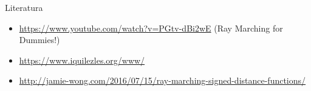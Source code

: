 \documentclass[12pt]{beamer}
\begin{document}
  \begin{frame}{Literatura}
    \begin{itemize}
    \item \href{https://www.youtube.com/watch?v=PGtv-dBi2wE}{https://www.youtube.com/watch?v=PGtv-dBi2wE} (Ray Marching for Dummies!)
    \item \href{https://www.iquilezles.org/www/}{https://www.iquilezles.org/www/}
    \item \href{http://jamie-wong.com/2016/07/15/ray-marching-signed-distance-functions/}{http://jamie-wong.com/2016/07/15/ray-marching-signed-distance-functions/}
    \end{itemize}
  \end{frame}
\end{document}
